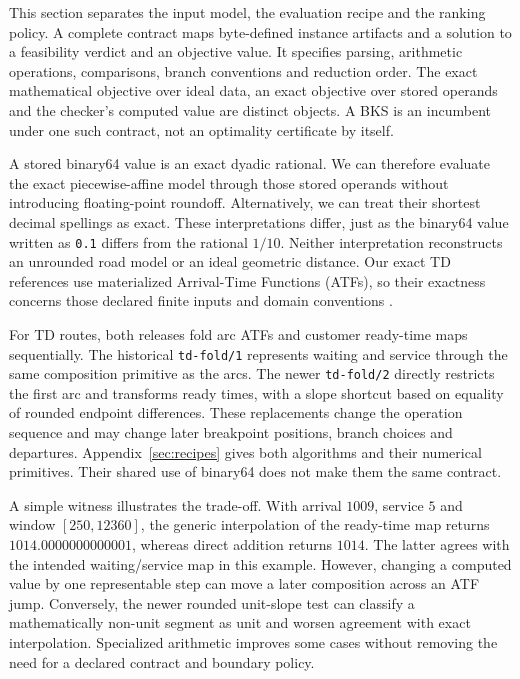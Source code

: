 \documentclass[11pt]{article}
\newcommand{\contractone}{\texttt{td-fold/1}}
\newcommand{\contracttwo}{\texttt{td-fold/2}}
\begin{document}
This section separates the input model, the evaluation recipe and the ranking policy. A complete contract maps byte-defined instance artifacts and a solution to a feasibility verdict and an objective value. It specifies parsing, arithmetic operations, comparisons, branch conventions and reduction order. The exact mathematical objective over ideal data, an exact objective over stored operands and the checker's computed value are distinct objects. A BKS is an incumbent under one such contract, not an optimality certificate by itself.

A stored binary64 value is an exact dyadic rational. We can therefore evaluate the exact piecewise-affine model through those stored operands without introducing floating-point roundoff. Alternatively, we can treat their shortest decimal spellings as exact. These interpretations differ, just as the binary64 value written as \texttt{0.1} differs from the rational $1/10$. Neither interpretation reconstructs an unrounded road model or an ideal geometric distance. Our exact TD references use materialized Arrival-Time Functions (ATFs), so their exactness concerns those declared finite inputs and domain conventions \autocite{pythonFraction2026}.

For TD routes, both releases fold arc ATFs and customer ready-time maps sequentially. The historical \contractone{} represents waiting and service through the same composition primitive as the arcs. The newer \contracttwo{} directly restricts the first arc and transforms ready times, with a slope shortcut based on equality of rounded endpoint differences. These replacements change the operation sequence and may change later breakpoint positions, branch choices and departures. Appendix~\ref{sec:recipes} gives both algorithms and their numerical primitives. Their shared use of binary64 does not make them the same contract.

A simple witness illustrates the trade-off. With arrival $1009$, service $5$ and window $[250,12360]$, the generic interpolation of the ready-time map returns $1014.0000000000001$, whereas direct addition returns $1014$. The latter agrees with the intended waiting/service map in this example. However, changing a computed value by one representable step can move a later composition across an ATF jump. Conversely, the newer rounded unit-slope test can classify a mathematically non-unit segment as unit and worsen agreement with exact interpolation. Specialized arithmetic improves some cases without removing the need for a declared contract and boundary policy.
\end{document}
